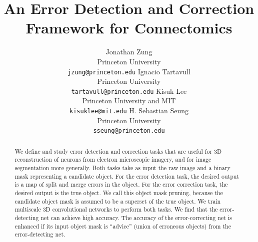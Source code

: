 \documentclass{article}
\title{An Error Detection and Correction Framework for Connectomics}
\author{
	Jonathan Zung\\
	Princeton University\\
	{\tt jzung@princeton.edu}
	\And
	Ignacio Tartavull\\
	Princeton University\\
	{\tt tartavull@princeton.edu}
	\And
	Kisuk Lee\\
	Princeton University and MIT\\
	{\tt kisuklee@mit.edu}
	\And
    H. Sebastian Seung\\
	Princeton University\\
	{\tt sseung@princeton.edu}
}
\begin{document}
\maketitle

\begin{abstract}
We define and study error detection and correction tasks that are
useful for 3D reconstruction of neurons from electron microscopic
imagery, and for image segmentation more generally. Both tasks take as
input the raw image and a binary mask representing a candidate
object. For the error detection task, the desired output is a map of
split and merge errors in the object. For the error correction task,
the desired output is the true object. We call this object mask
pruning, because the candidate object mask is assumed to be a superset
of the true object. We train multiscale 3D convolutional networks to
perform both tasks. We find that the error-detecting net can achieve
high accuracy. The accuracy of the error-correcting net is enhanced if
its input object mask is ``advice'' (union of erroneous objects) from
the error-detecting net.
\end{abstract}
\end{document}
